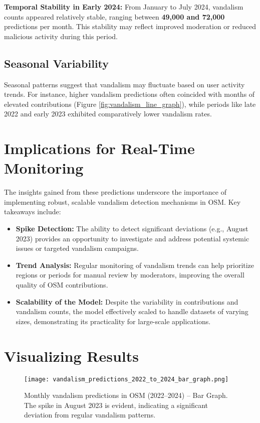\documentclass[
    13pt, %
    a4paper, %
    DIV14, %
    listof=totoc, %
    bibliography=totoc, %
    index=totoc, %
    headsepline
]{scrreprt}
\begin{document}
\textbf{Temporal Stability in Early 2024:} From January to July 2024, vandalism counts appeared relatively stable, ranging between \textbf{49,000 and 72,000} predictions per month. This stability may reflect improved moderation or reduced malicious activity during this period.

\subsection{Seasonal Variability}
Seasonal patterns suggest that vandalism may fluctuate based on user activity trends. For instance, higher vandalism predictions often coincided with months of elevated contributions (Figure \ref{fig:vandalism_line_graph}), while periods like late 2022 and early 2023 exhibited comparatively lower vandalism rates.

\section{Implications for Real-Time Monitoring}
The insights gained from these predictions underscore the importance of implementing robust, scalable vandalism detection mechanisms in OSM. Key takeaways include:
\begin{itemize}
    \item \textbf{Spike Detection:} The ability to detect significant deviations (e.g., August 2023) provides an opportunity to investigate and address potential systemic issues or targeted vandalism campaigns.
    \item \textbf{Trend Analysis:} Regular monitoring of vandalism trends can help prioritize regions or periods for manual review by moderators, improving the overall quality of OSM contributions.
    \item \textbf{Scalability of the Model:} Despite the variability in contributions and vandalism counts, the model effectively scaled to handle datasets of varying sizes, demonstrating its practicality for large-scale applications.
\end{itemize}

\section{Visualizing Results}

\begin{figure}[H]
    \centering
    \texttt{[image: vandalism\_predictions\_2022\_to\_2024\_bar\_graph.png]}
    \caption{Monthly vandalism predictions in OSM (2022–2024) – Bar Graph. The spike in August 2023 is evident, indicating a significant deviation from regular vandalism patterns.}
    \label{fig:vandalism_bar_graph}
\end{figure}
\end{document}
